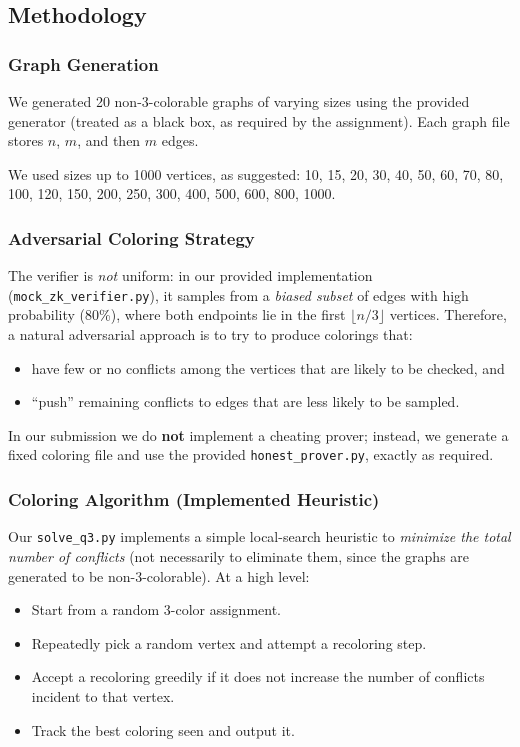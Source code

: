 \documentclass[11pt]{article}
\begin{document}
\subsection{Methodology}

\subsubsection{Graph Generation}
We generated 20 non-3-colorable graphs of varying sizes using the provided generator (treated as a black box, as required by the assignment). Each graph file stores $n$, $m$, and then $m$ edges.

We used sizes up to 1000 vertices, as suggested:
10, 15, 20, 30, 40, 50, 60, 70, 80, 100, 120, 150, 200, 250, 300, 400, 500, 600, 800, 1000.

\subsubsection{Adversarial Coloring Strategy}
The verifier is \emph{not} uniform: in our provided implementation (\texttt{mock\_zk\_verifier.py}), it samples from a \emph{biased subset} of edges with high probability (80\%), where both endpoints lie in the first $\lfloor n/3 \rfloor$ vertices. Therefore, a natural adversarial approach is to try to produce colorings that:
\begin{itemize}
    \item have few or no conflicts among the vertices that are likely to be checked, and
    \item ``push'' remaining conflicts to edges that are less likely to be sampled.
\end{itemize}

In our submission we do \textbf{not} implement a cheating prover; instead, we generate a fixed coloring file and use the provided \texttt{honest\_prover.py}, exactly as required.

\subsubsection{Coloring Algorithm (Implemented Heuristic)}
Our \texttt{solve\_q3.py} implements a simple local-search heuristic to \emph{minimize the total number of conflicts} (not necessarily to eliminate them, since the graphs are generated to be non-3-colorable). At a high level:
\begin{itemize}
    \item Start from a random 3-color assignment.
    \item Repeatedly pick a random vertex and attempt a recoloring step.
    \item Accept a recoloring greedily if it does not increase the number of conflicts incident to that vertex.
    \item Track the best coloring seen and output it.
\end{itemize}
\end{document}
